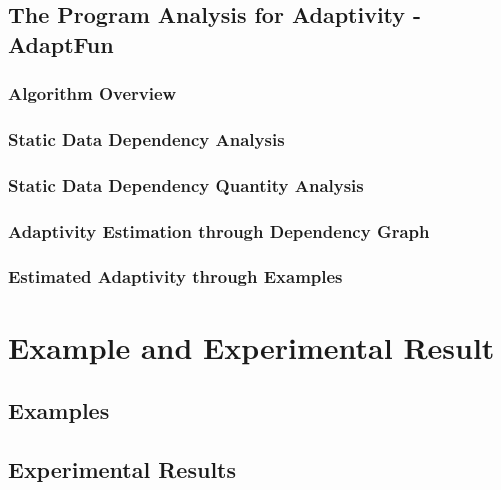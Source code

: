 \documentclass[12pt, letterpaper]{report}   %
\newcommand{\THESYSTEM}{\textsf{AdaptFun}}
\begin{document}
\clearpage
\section{The Program Analysis for Adaptivity - {\THESYSTEM}}
\label{sec:adapt-static}


\subsection{Algorithm Overview}
\label{sec:static-overview}



\subsection{Static Data Dependency Analysis}
\label{sec:static-dep}
% 


\subsection{Static Data Dependency Quantity Analysis}
\label{sec:static-quantity}


\subsection{Adaptivity Estimation through Dependency Graph}
\label{sec:static-adapt}



\subsection{Estimated Adaptivity through Examples}
\label{sec:static-examples}



\clearpage
\chapter{Example and Experimental Result }
\label{sec:adapt-implementation}
\section{Examples}
\label{sec:adapt-example}

\section{Experimental Results}
\label{sec:adapt-eval}

\end{document}
